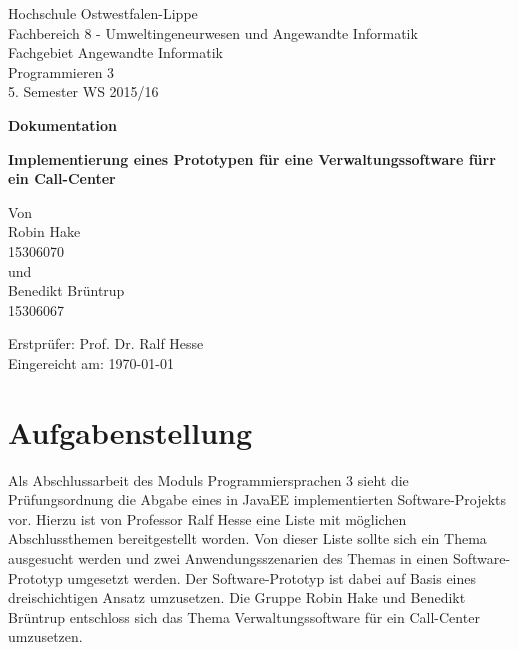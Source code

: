 \documentclass[12pt, a4paper]{article}
\begin{document}
\begin{titlepage}
Hochschule Ostwestfalen-Lippe \\
Fachbereich 8 - Umweltingeneurwesen und Angewandte Informatik \\
Fachgebiet Angewandte Informatik \\
Programmieren 3 \\
5. Semester WS 2015/16\\
\vspace{2cm}

\begin{center}
\begin{Large}
\textbf{Dokumentation} \\
\end{Large}
\vspace{2cm}

\begin{Large}
\textbf {Implementierung eines Prototypen für eine Verwaltungssoftware fürr ein Call-Center} \\[0.35cm]
\end{Large}
Von \\[0.35cm]
Robin Hake \\
15306070 \\[0.35cm]
und\\[0.35cm]
Benedikt Brüntrup \\
15306067 \\[0.35cm]
\end{center}

\vfill
Erstprüfer: Prof. Dr. Ralf Hesse \\
Eingereicht am: {\today}
\end{titlepage}

\newpage
\tableofcontents


\vfill
\newpage


\section{Aufgabenstellung}
Als Abschlussarbeit des Moduls \glqq Programmiersprachen 3\grqq{} sieht die Prüfungsordnung die Abgabe eines in JavaEE implementierten Software-Projekts vor. Hierzu ist von Professor Ralf Hesse eine Liste mit möglichen Abschlussthemen bereitgestellt worden. Von dieser Liste sollte sich ein Thema ausgesucht werden und zwei Anwendungsszenarien des Themas in einen Software-Prototyp umgesetzt werden. Der Software-Prototyp ist dabei auf Basis eines dreischichtigen Ansatz umzusetzen.  Die Gruppe Robin Hake und Benedikt Brüntrup entschloss sich das Thema \glqq Verwaltungssoftware für ein Call-Center\grqq{} umzusetzen.
\end{document}
